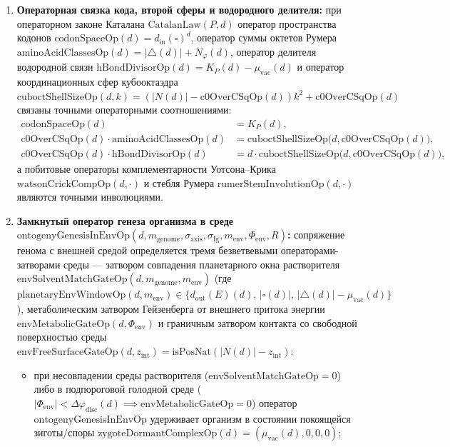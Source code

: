\begin{theorem}
\begin{enumerate}[label=\textbf{(\roman*)},leftmargin=*]
\item \textbf{Операторная связка кода, второй сферы и водородного делителя:}
  при операторном законе Каталана $\mathrm{CatalanLaw}(P,d)$ оператор пространства кодонов $\mathrm{codonSpaceOp}(d) = d_{\mathrm{in}}(\square)^d$, оператор суммы октетов Румера $\mathrm{aminoAcidClassesOp}(d) = |{\triangle}(d)| + N_\varphi(d)$, оператор делителя водородной связи $\mathrm{hBondDivisorOp}(d) = K_P(d) - \mu_{\mathrm{vac}}(d)$ и оператор координационных сфер кубооктаэдра $\mathrm{cuboctShellSizeOp}(d,k) = (|N(d)| - \mathrm{c0OverCSqOp}(d))k^2 + \mathrm{c0OverCSqOp}(d)$ связаны точными операторными соотношениями:
  \begin{equation}
  \label{eq:bio-operator-identities-clean}
  \begin{aligned}
    \mathrm{codonSpaceOp}(d) &= K_P(d),\\
    \mathrm{c0OverCSqOp}(d)\cdot\mathrm{aminoAcidClassesOp}(d) &= \mathrm{cuboctShellSizeOp}\bigl(d,\mathrm{c0OverCSqOp}(d)\bigr),\\
    \mathrm{c0OverCSqOp}(d)\cdot\mathrm{hBondDivisorOp}(d) &= d\cdot\mathrm{cuboctShellSizeOp}\bigl(d,\mathrm{c0OverCSqOp}(d)\bigr),
  \end{aligned}
  \end{equation}
  а побитовые операторы комплементарности Уотсона--Крика $\mathrm{watsonCrickCompOp}(d,\cdot)$ и стебля Румера $\mathrm{rumerStemInvolutionOp}(d,\cdot)$ являются точными инволюциями.
\item \textbf{Замкнутый оператор генеза организма в среде $\mathrm{ontogenyGenesisInEnvOp}(d,m_{\mathrm{genome}},\sigma_{\mathrm{axis}},\sigma_{\mathrm{Ig}},m_{\mathrm{env}},\Phi_{\mathrm{env}},R)$:}
  сопряжение генома с внешней средой определяется тремя безветвевыми операторами-затворами среды --- затвором совпадения планетарного окна растворителя $\mathrm{envSolventMatchGateOp}(d,m_{\mathrm{genome}},m_{\mathrm{env}})$ (где $\mathrm{planetaryEnvWindowOp}(d,m_{\mathrm{env}})\in\{d_{\mathrm{out}}(E)(d),\,|\square(d)|,\,|{\triangle}(d)|-\mu_{\mathrm{vac}}(d)\}$), метаболическим затвором Гейзенберга от внешнего притока энергии $\mathrm{envMetabolicGateOp}(d,\Phi_{\mathrm{env}})$ и граничным затвором контакта со свободной поверхностью среды $\mathrm{envFreeSurfaceGateOp}(d,z_{\mathrm{int}}) = \mathrm{isPosNat}(|N(d)| - z_{\mathrm{int}})$:
  \begin{itemize}[noitemsep]
  \item при несовпадении среды растворителя ($\mathrm{envSolventMatchGateOp}=0$) либо в подпороговой голодной среде ($|\Phi_{\mathrm{env}}| < \Delta\varphi_{\mathrm{disc}}(d) \implies \mathrm{envMetabolicGateOp}=0$) оператор $\mathrm{ontogenyGenesisInEnvOp}$ удерживает организм в состоянии покоящейся зиготы/споры $\mathrm{zygoteDormantComplexOp}(d) = (\mu_{\mathrm{vac}}(d),0,0,0)$;

\end{itemize}
\end{enumerate}
\end{theorem}
